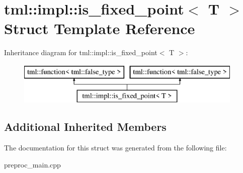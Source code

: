 \hypertarget{structtml_1_1impl_1_1is__fixed__point}{\section{tml\+:\+:impl\+:\+:is\+\_\+fixed\+\_\+point$<$ T $>$ Struct Template Reference}
\label{structtml_1_1impl_1_1is__fixed__point}
}
Inheritance diagram for tml\+:\+:impl\+:\+:is\+\_\+fixed\+\_\+point$<$ T $>$\+:\begin{figure}[H]
\begin{center}
\leavevmode
\includegraphics[height=2.000000cm]{structtml_1_1impl_1_1is__fixed__point}
\end{center}
\end{figure}
\subsection*{Additional Inherited Members}


The documentation for this struct was generated from the following file\+:\begin{DoxyCompactItemize}
\item 
preproc\+\_\+main.\+cpp\end{DoxyCompactItemize}
